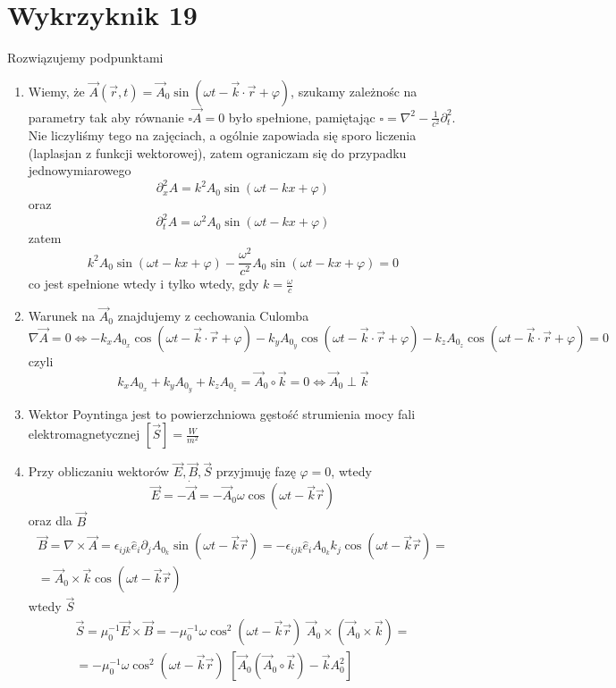 \documentclass[a4paper,12pt]{article}
\begin{document}
\section{Wykrzyknik 19}
	Rozwiązujemy podpunktami
	\begin{enumerate}
		\item Wiemy, że $\vec{A}(\vec{r},t) = \vec{A}_0 \sin(\omega t - \vec{k}\cdot\vec{r}+\varphi)$, szukamy zależnośc na parametry tak aby
		równanie $\square\vec{A}=0$ było spełnione, pamiętając $\square = \nabla^2 - \frac{1}{c^2}\partial_t^2$.\\
		Nie liczyliśmy tego na zajęciach, a ogólnie zapowiada się sporo liczenia (laplasjan z funkcji wektorowej), zatem ograniczam się do przypadku jednowymiarowego
		$$
			\partial_x^2 A = k^2 A_0 \sin(\omega t - kx +\varphi)
		$$
		oraz
		$$
			\partial_t^2 A = \omega^2 A_0\sin(\omega t - kx+\varphi)
		$$
		zatem 
		$$
			 k^2 A_0 \sin(\omega t - kx +\varphi) - \frac{\omega^2}{c^2}A_0\sin(\omega t - kx+\varphi) = 0 
		$$
		co jest spełnione wtedy i tylko wtedy, gdy $k = \frac{\omega}{c}$
		\item Warunek na $\vec{A}_0$ znajdujemy z cechowania Culomba
		$$
			\nabla \vec{A} = 0 \Leftrightarrow -k_xA_{0_x} \cos(\omega t - \vec{k}\cdot\vec{r}+\varphi) - k_yA_{0_y}\cos(\omega t - \vec{k}\cdot\vec{r}+\varphi)
			-k_z A_{0_z} \cos(\omega t - \vec{k}\cdot\vec{r}+\varphi) = 0 
		$$
		czyli 
		$$
			k_xA_{0_x} + k_yA_{0_y} + k_zA_{0_z} = \vec{A}_0 \circ \vec{k} = 0  \Leftrightarrow \vec{A}_0 \perp \vec{k}
		$$
		\item Wektor Poyntinga jest to powierzchniowa gęstość strumienia mocy fali elektromagnetycznej $[\vec{S}] = \frac{W}{m^2}$
		\item Przy obliczaniu wektorów $\vec{E},\vec{B},\vec{S}$ przyjmuję fazę $\varphi =0$, wtedy
		$$
			\vec{E} = -\dot{\vec{A}} = -\vec{A}_0\omega\cos(\omega t -\vec{k}\vec{r})
		$$
		oraz dla $\vec{B}$
		$$
		\begin{array}{l}
			\vec{B} = \nabla\times\vec{A} = \epsilon_{ijk}\hat{e}_i\partial_j A_{0_k}\sin(\omega t-\vec{k}\vec{r}) = -\epsilon_{ijk}\hat{e}_i A_{0_k}k_j\cos(\omega t-\vec{k}\vec{r}) =\\
			=\vec{A}_0\times\vec{k}\cos(\omega t-\vec{k}\vec{r})
		\end{array}
		$$
		wtedy $\vec{S}$
		$$
		\begin{array}{l}
			\vec{S}=\mu_0^{-1}\vec{E}\times\vec{B} = -\mu_0^{-1}\omega\cos^2(\omega t-\vec{k}\vec{r})\,\,\vec{A}_0\times(\vec{A}_0\times\vec{k}) =\\
			= -\mu_0^{-1}\omega\cos^2(\omega t-\vec{k}\vec{r})\,\, \left[\vec{A}_0(\vec{A}_0\circ\vec{k})-\vec{k}A_0^2\right]
		\end{array}
		$$
	\end{enumerate}
\end{document}
